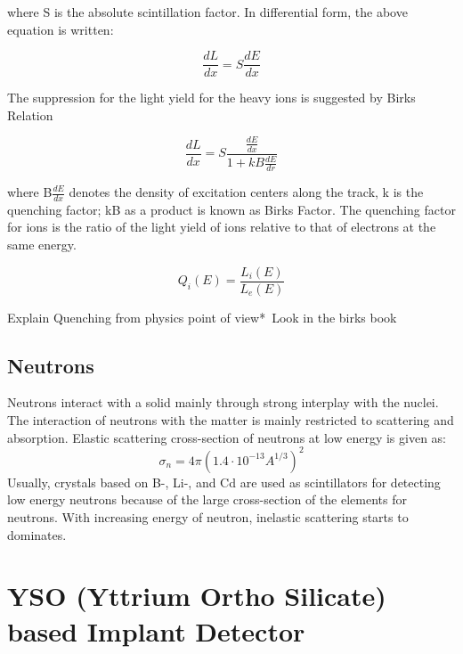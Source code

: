 where S is the absolute scintillation factor. In differential form, the above equation is written:

\begin{equation}
\frac{dL}{dx}= S\frac{dE}{dx}
\end{equation}

The suppression for the light yield for the heavy ions is suggested by Birks Relation

\begin{equation}
\frac{dL}{dx}= S\frac{\frac{dE}{dx}}{1+kB\frac{dE}{dr}}
\end{equation}

where B$\frac{dE}{dx}$ denotes the density of excitation centers along the track, k is the quenching factor; kB as a product is known as Birks Factor. The quenching factor for ions is the ratio of the light yield of ions relative to that of electrons at the same energy.

\begin{equation}
Q_{i}(E)=\frac{L_{i}(E)}{L_{e}(E)}
\end{equation}


\*Explain Quenching from physics point of view*\ Look in the birks book 


\subsection{Neutrons}
Neutrons interact with a solid mainly through strong interplay with the nuclei. The interaction of neutrons with the matter is mainly restricted to scattering and absorption. Elastic scattering cross-section of neutrons at low energy is given as:
\begin{equation}
\sigma_{n}=4\pi(1.4 \cdot 10^{-13} A^{1/3})^{2}
\end{equation}
Usually, crystals based on B-, Li-, and Cd are used as scintillators for detecting low energy neutrons because of the large cross-section of the elements for neutrons. With increasing energy of neutron, inelastic scattering starts to dominates.

\section{YSO (Yttrium Ortho Silicate) based Implant Detector}

